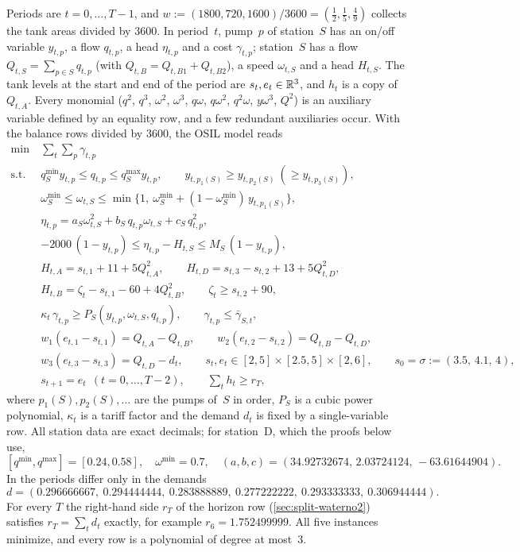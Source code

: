 Periods are $t=0,\dots,T-1$, and $w:=(1800,720,1600)/3600=(\tfrac12,\tfrac15,\tfrac49)$ collects the tank areas divided by 3600.
In period~$t$, pump~$p$ of station~$S$ has an on/off variable $y_{t,p}$, a flow $q_{t,p}$, a head $\eta_{t,p}$ and a cost $\gamma_{t,p}$; station~$S$ has a flow $Q_{t,S}=\sum_{p\in S}q_{t,p}$ (with $Q_{t,B}=Q_{t,B1}+Q_{t,B2}$), a speed $\omega_{t,S}$ and a head $H_{t,S}$.
The tank levels at the start and end of the period are $s_t,e_t\in\mathbb{R}^3$, and $h_t$ is a copy of $Q_{t,A}$.
Every monomial ($q^2$, $q^3$, $\omega^2$, $\omega^3$, $q\omega$, $q\omega^2$, $q^2\omega$, $y\omega^3$, $Q^2$) is an auxiliary variable defined by an equality row, and a few redundant auxiliaries occur.
With the balance rows divided by 3600, the OSIL model reads
\begin{equation}\label{eq:waterno2-model}
\begin{aligned}
\min\ & \textstyle\sum_{t}\sum_{p}\gamma_{t,p}\\
\text{s.t. }& q^{\min}_S y_{t,p}\le q_{t,p}\le q^{\max}_S y_{t,p},\qquad y_{t,p_1(S)}\ge y_{t,p_2(S)}\ (\ge y_{t,p_3(S)}),\\
& \omega^{\min}_S\le\omega_{t,S}\le\min\{1,\ \omega^{\min}_S+(1-\omega^{\min}_S)\,y_{t,p_1(S)}\},\\
& \eta_{t,p}=a_S\omega_{t,S}^2+b_S\,q_{t,p}\omega_{t,S}+c_S\,q_{t,p}^2,\\
& -2000\,(1-y_{t,p})\le\eta_{t,p}-H_{t,S}\le M_S\,(1-y_{t,p}),\\
& H_{t,A}=s_{t,1}+11+5Q_{t,A}^2,\qquad H_{t,D}=s_{t,3}-s_{t,2}+13+5Q_{t,D}^2,\\
& H_{t,B}=\zeta_t-s_{t,1}-60+4Q_{t,B}^2,\qquad \zeta_t\ge s_{t,2}+90,\\
& \kappa_t\,\gamma_{t,p}\ge P_S(y_{t,p},\omega_{t,S},q_{t,p}),\qquad \gamma_{t,p}\le\bar\gamma_{S,t},\\
& w_1(e_{t,1}-s_{t,1})=Q_{t,A}-Q_{t,B},\qquad w_2(e_{t,2}-s_{t,2})=Q_{t,B}-Q_{t,D},\\
& w_3(e_{t,3}-s_{t,3})=Q_{t,D}-d_t,\qquad s_t,e_t\in[2,5]\times[2.5,5]\times[2,6],\qquad s_0=\sigma:=(3.5,\,4.1,\,4),\\
& s_{t+1}=e_t\ \ (t=0,\dots,T-2),\qquad \textstyle\sum_t h_t\ge r_T,
\end{aligned}
\end{equation}
where $p_1(S),p_2(S),\dots$ are the pumps of~$S$ in order, $P_S$ is a cubic power polynomial, $\kappa_t$ is a tariff factor and the demand $d_t$ is fixed by a single-variable row.
All station data are exact decimals; for station~D, which the proofs below use,
\[
[q^{\min},q^{\max}]=[0.24,0.58],\quad \omega^{\min}=0.7,\quad (a,b,c)=(34.92732674,\,2.03724124,\,-63.61644904).
\]
In  the periods differ only in the demands
\[
d=(0.296666667,\ 0.294444444,\ 0.283888889,\ 0.277222222,\ 0.293333333,\ 0.306944444).
\]
For every $T$ the right-hand side $r_T$ of the horizon row (\cref{sec:split-waterno2}) satisfies $r_T=\sum_t d_t$ exactly, for example $r_6=1.752499999$.
All five instances minimize, and every row is a polynomial of degree at most~3.

